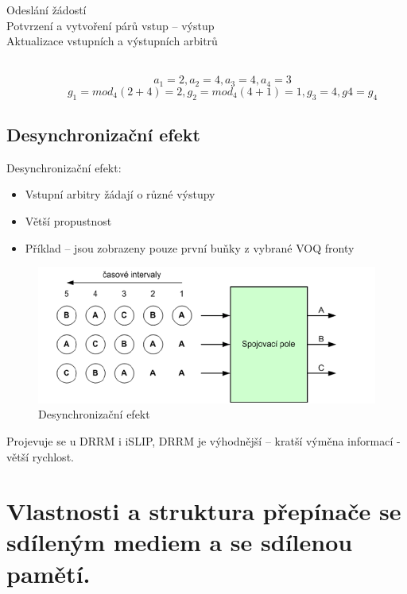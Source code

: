 \begin{description}
\item [Odeslání žádostí] \hfill
\item [Potvrzení a vytvoření párů vstup -- výstup] \hfill
\item [Aktualizace vstupních a výstupních arbitrů] \hfill \\
\begin{equation}
    a_1 = 2, a_2 = 4, a_3 = 4, a_4 = 3
\end{equation}
\begin{equation}
    g_1 = mod_4{(2+4)} = 2, g_2 = mod_4{(4+1) = 1}, g_3 = 4, g4 = g_4
\end{equation}
\end{description}
\subsection{Desynchronizační efekt}
Desynchronizační efekt:
\begin{itemize}
    \item Vstupní arbitry žádají o různé výstupy
    \item Větší propustnost
    \item Příklad -- jsou zobrazeny pouze první buňky z vybrané VOQ fronty
\end{itemize}
\begin{figure}[ht]
\centering
  \begin{center}
    \includegraphics[scale=0.6]{BPC-HWS/images/DRRM_desyn.png}
  \end{center}
  \caption[Desynchronizační efekt]{Desynchronizační efekt}
\end{figure}
Projevuje se u DRRM i iSLIP, DRRM je výhodnější -- kratší výměna informací - větší rychlost.

\newpage
\section{Vlastnosti a struktura přepínače se sdíleným mediem a se sdílenou pamětí.}
